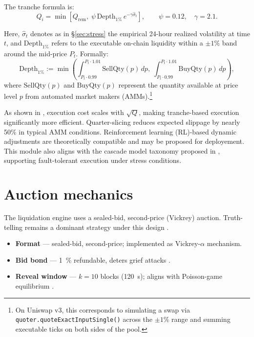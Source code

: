 \documentclass[11pt]{article}
\begin{document}
The tranche formula is:
\begin{equation}\label{eq:tranche}
Q_i = \min \left[ Q_{\text{rem}},\;
                  \psi\,\text{Depth}_{1\%}\,e^{-\gamma \widehat{\sigma}_t} \right],
\qquad \psi = 0.12,\quad \gamma = 2.1.
\end{equation}

Here, \( \widehat{\sigma}_t \) denotes as in §\ref{sec:stress} the empirical 24-hour realized volatility at time \( t \), and \( \text{Depth}_{1\%} \) refers to the executable on-chain liquidity within a \(\pm 1\%\) band around the mid-price \( P_t \). Formally:
\[
\text{Depth}_{1\%} := \min \left(
\int_{P_t \cdot 0.99}^{P_t \cdot 1.01} \text{SellQty}(p)\,dp,\;
\int_{P_t \cdot 0.99}^{P_t \cdot 1.01} \text{BuyQty}(p)\,dp
\right),
\]
where \( \text{SellQty}(p) \) and \( \text{BuyQty}(p) \) represent the quantity available at price level \( p \) from automated market makers (AMMs).\footnote{On Uniswap v3, this corresponds to simulating a swap via \texttt{quoter.quoteExactInputSingle()} across the \(\pm 1\%\) range and summing executable ticks on both sides of the pool.}

As shown in \textcite{almgren2000optimal}, execution cost scales with \( \sqrt{Q} \), making tranche-based execution significantly more efficient. Quarter-slicing reduces expected slippage by nearly 50\% in typical AMM conditions.  
Reinforcement learning (RL)-based dynamic adjustments \parencite{zhang2023adaptive} are theoretically compatible and may be proposed for deployement.  
This module also aligns with the cascade model taxonomy proposed in \textcite{zhao2025reliability}, supporting fault-tolerant execution under stress conditions.





\section{Auction mechanics}
\label{sec:auction}

The liquidation engine uses a sealed-bid, second-price (Vickrey) auction. Truth-telling remains a dominant strategy under this design \parencite{myerson1994bayesian}.

\begin{itemize}[leftmargin=*]
\item \textbf{Format} — sealed-bid, second-price; implemented as Vickrey-$\alpha$ mechanism.
\item \textbf{Bid bond} — \SI{1}{\percent} refundable, deters grief attacks \parencite{tian2025defi}.
\item \textbf{Reveal window} — $k{=}10$ blocks (\SI{120}{\second}); aligns with Poisson-game equilibrium \parencite{meroni2017games}.
\end{itemize}
\end{document}
